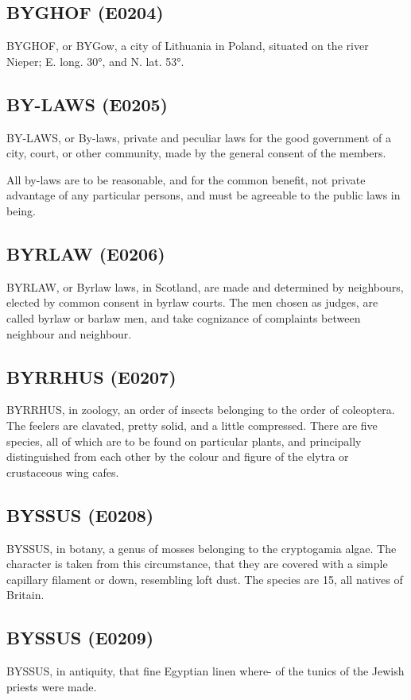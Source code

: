 \documentclass{article}
\begin{document}
\subsection*{BYGHOF (E0204)}
BYGHOF, or BYGow, a city of Lithuania in Poland, situated on the river Nieper; E. long. 30°, and N. lat. 53°.

\subsection*{BY-LAWS (E0205)}
BY-LAWS, or By-laws, private and peculiar laws for the good government of a city, court, or other community, made by the general consent of the members.

All by-laws are to be reasonable, and for the common benefit, not private advantage of any particular persons, and must be agreeable to the public laws in being.

\subsection*{BYRLAW (E0206)}
BYRLAW, or Byrlaw laws, in Scotland, are made and determined by neighbours, elected by common consent in byrlaw courts. The men chosen as judges, are called byrlaw or barlaw men, and take cognizance of complaints between neighbour and neighbour.

\subsection*{BYRRHUS (E0207)}
BYRRHUS, in zoology, an order of insects belonging to the order of coleoptera. The feelers are clavated, pretty solid, and a little compressed. There are five species, all of which are to be found on particular plants, and principally distinguished from each other by the colour and figure of the elytra or crustaceous wing cafes.

\subsection*{BYSSUS (E0208)}
BYSSUS, in botany, a genus of mosses belonging to the cryptogamia algae. The character is taken from this circumstance, that they are covered with a simple capillary filament or down, resembling loft dust. The species are 15, all natives of Britain.

\subsection*{BYSSUS (E0209)}
BYSSUS, in antiquity, that fine Egyptian linen where-
of the tunics of the Jewish priests were made.
\end{document}
